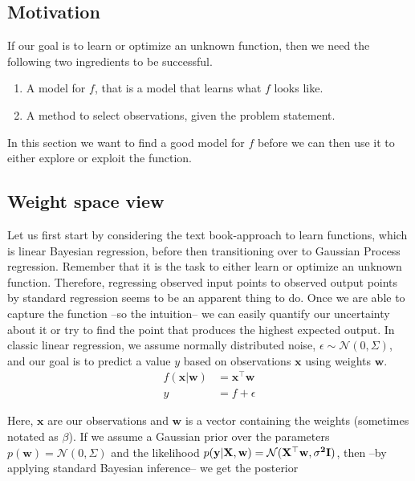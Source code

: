 \documentclass[authoryear,11pt,review]{elsarticle}
\begin{document}
\subsection{Motivation}
If our goal is to learn or optimize an unknown function, then we need the following two ingredients to be successful.

\begin{enumerate}
\item A model for $f$, that is a model that learns what $f$ looks like.
\item A method to select observations, given the problem statement.
\end{enumerate}

In this section we want to find a good model for $f$ before we can then use it to either explore or exploit the function.


\subsection{Weight space view}
Let us first start by considering the text book-approach to learn functions, which is linear Bayesian regression, before then transitioning over to Gaussian Process regression. Remember that it is the task to either learn or optimize an unknown function. Therefore, regressing observed input points to observed output points by standard regression seems to be an apparent thing to do. Once we are able to capture the function --so the intuition-- we can easily quantify our uncertainty about it or try to find the point that produces the highest expected output.
In classic linear regression, we assume normally distributed noise, $\epsilon\sim\mathcal{N}(0, \Sigma)$, and our goal is to predict a value $y$ based on observations $\mathbf{x}$ using weights $\mathbf{w}$.\\

\begin{align*}
f(\mathbf{x}|\mathbf{w})&=\mathbf{x}^\top\mathbf{w}\\
y&=f+\epsilon
\end{align*}

Here, $\mathbf{x}$ are our observations and $\mathbf{w}$ is a vector containing the weights (sometimes notated as $\beta$). If we assume a Gaussian prior over the parameters $p(\mathbf{w})=\mathcal{N}(0, \Sigma)$ and the likelihood $p(\mathbf{y}|\bf{X,w})=\mathcal{N}(\mathbf{X}^\top \mathbf{w},\sigma^2\mathbf{I})$, then --by applying standard Bayesian inference-- we get the posterior
\end{document}
